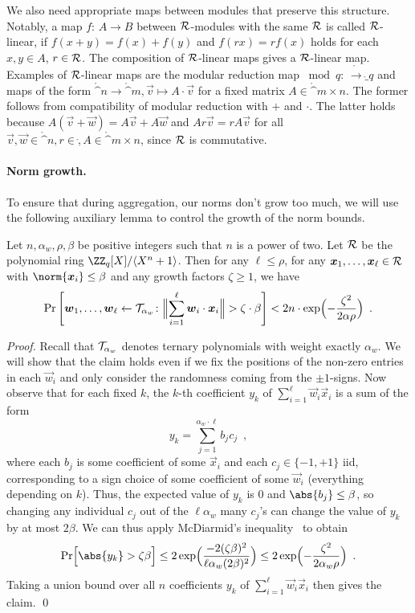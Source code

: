 We also need appropriate maps between modules that preserve this structure. Notably, a map $f\colon\,A\to B$ between $\mathcal{R}$-modules with the same $\mathcal{R}$ is called $\mathcal{R}$-linear, if $f(x+y) = f(x) + f(y)$ and $f(rx) = rf(x)$ holds for each $x,y\in A$, $r\in\mathcal{R}$. The composition of $\mathcal{R}$-linear maps gives a $\mathcal{R}$-linear map.
Examples of $\mathcal{R}$-linear maps are the modular reduction map ${}\bmod q\colon\,\ring\to\ring_q$ and maps of the form $\ring^n \to \ring^m, \vec{v}\mapsto A\cdot \vec{v}$ for a fixed matrix $A\in\ring^{m\times n}$. The former follows from compatibility of modular reduction with $+$ and $\cdot$. The latter holds because $A(\vec{v}+\vec{w}) = A\vec{v} + A\vec{w}$ and $Ar\vec{v} = rA\vec{v}$ for all $\vec{v},\vec{w}\in\ring^n, r\in \ring, A\in\ring^{m\times n}$, since $\mathcal{R}$ is commutative.

\paragraph{Norm growth.}
To ensure that during aggregation, our norms don't grow too much, we will use the following auxiliary lemma to control the growth of the norm bounds.
\begin{lemma}\label{lem:normgrowth}
Let $n, \alpha_w, \rho, \beta$ be positive integers such that $n$ is a power of two.
Let $\mathcal{R}$ be the polynomial ring $\defringq$.
Then for any $\ell\leq \rho$, for any $\boldsymbol{x}_1,\ldots,\boldsymbol{x}_\ell\in \mathcal{R}$ with $\norm{\vec{x}_i}\leq \beta$ and any growth factors $\zeta \geq 1$, we have
\[
 \Pr\left[\vec{w}_1,\ldots,\vec{w}_\ell \gets \tern_{\alpha_w}\colon \Bigl\|\smashoperator{\sum_{i=1}^{\ell}} \vec{w}_i\cdot \vec{x}_i\Bigr\| > \zeta\cdot \beta \right] < 2n\cdot \exp\Bigl(-\frac{\zeta^2}{2\alpha\rho}\Bigr)\enspace.
\]
\end{lemma}
\begin{proof}
Recall that $\mathcal{T}_{\alpha_w}$ denotes ternary polynomials with weight exactly $\alpha_w$. We will show that the claim holds even if we fix the positions of the non-zero entries in each $\vec{w}_i$ and only consider the randomness coming from the $\pm 1$-signs.
Now observe that for each fixed $k$, the $k$-th coefficient $y_k$ of $\sum_{i=1}^{\ell} \vec{w}_i \vec{x}_i$ is a sum of the form
\[
 y_k = \sum_{j=1}^{\alpha_w\cdot \ell} b_j c_j\enspace,
\]
where each $b_j$ is some coefficient of some $\vec{x}_i$ and each $c_j\in\{-1,+1\}$ iid, corresponding to a sign choice of some coefficient of some $\vec{w}_i$ (everything depending on $k$).
Thus, the expected value of $y_k$ is 0 and $\abs{b_j}\leq \beta$, so changing any individual $c_j$ out of the $\ell\alpha_w$ many $c_j$'s can change the value of $y_k$ by at most $2\beta$.
We can thus apply McDiarmid's inequality~\cite{McDiarmid89} to obtain
\[
 \Pr\Bigl[\abs{y_k} > \zeta\beta\Bigr] \leq 2\exp\Bigl(\frac{-2(\zeta\beta)^2}{\ell\alpha_w(2\beta)^2}\Bigr) \leq 2\exp\Bigl(- \frac{\zeta^2}{2\alpha_w\rho} \Bigr)\enspace.
\]
Taking a union bound over all $n$ coefficients $y_k$ of $\sum_{i=1}^{\ell} \vec{w}_i \vec{x}_i$ then gives the claim.
\qed
\end{proof}

